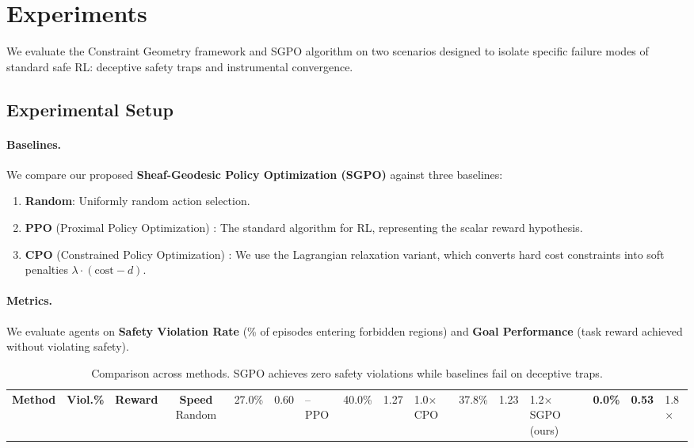 \section{Experiments}
\label{sec:experiments}

We evaluate the Constraint Geometry framework and SGPO algorithm on two scenarios designed to isolate specific failure modes of standard safe RL: deceptive safety traps and instrumental convergence.

\subsection{Experimental Setup}

\paragraph{Baselines.} We compare our proposed \textbf{Sheaf-Geodesic Policy Optimization (SGPO)} against three baselines:
\begin{enumerate}
    \item \textbf{Random}: Uniformly random action selection.
    \item \textbf{PPO} (Proximal Policy Optimization) \citep{schulman2017proximal}: The standard algorithm for RL, representing the scalar reward hypothesis.
    \item \textbf{CPO} (Constrained Policy Optimization) \citep{achiam2017constrained}: We use the Lagrangian relaxation variant, which converts hard cost constraints into soft penalties $\lambda \cdot (\text{cost} - d)$.
\end{enumerate}

\paragraph{Metrics.} We evaluate agents on \textbf{Safety Violation Rate} (\% of episodes entering forbidden regions) and \textbf{Goal Performance} (task reward achieved without violating safety).

\begin{table}[t]
\caption{Comparison across methods. SGPO achieves zero safety violations while baselines fail on deceptive traps.}
\label{tab:main_results}
\centering
\small
\begin{tabular}{@{}lccc@{}}
\toprule
\textbf{Method} & \textbf{Viol.\%} & \textbf{Reward} & \textbf{Speed} 
\midrule
Random & 27.0\% & 0.60 & -- 
PPO & 40.0\% & 1.27 & 1.0$\times$ 
CPO & 37.8\% & 1.23 & 1.2$\times$ 
SGPO (ours) & \textbf{0.0\%} & \textbf{0.53} & 1.8$\times$ 
\bottomrule
\end{tabular}
\end{table}

